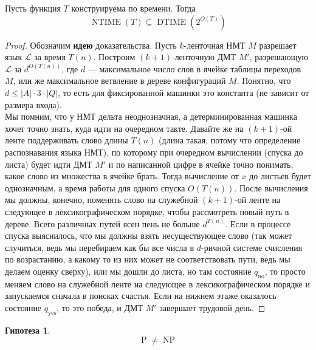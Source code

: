 \documentclass[11pt]{article}
\DeclareMathOperator{\DTIME}{DTIME}
\DeclareMathOperator{\NTIME}{NTIME}
\DeclareMathOperator{\Poly}{P}
\DeclareMathOperator{\NP}{NP}
\newtheorem{hypothesis}{Гипотеза}
\begin{document}
\begin{theorem}
    Пусть функция $T$ конструируема по времени. Тогда 
    \[\NTIME(T) \subseteq \DTIME(2^{O(T)})\]
\end{theorem}

\begin{proof}
    Обозначим \textbf{идею} доказательства. Пусть $k$-ленточная НМТ $M$ разрешает язык $\mathcal{L}$ за время $T(n)$. Построим $(k + 1)$-ленточную ДМТ $M'$, разрешающую $\mathcal{L}$ за $d^{O(T(n))}$, где $d$ --- максимальное число слов в ячейке таблицы переходов $M$, или же максимальное ветвление в дереве конфигураций $M$. Понятно, что $d \leq \left\lvert A \right\rvert \cdot 3 \cdot \left\lvert Q \right\rvert$, то есть для фиксированной машинки это константа (не зависит от размера входа). \\
    Мы помним, что у НМТ дельта неоднозначная, а детерминированная машинка хочет точно знать, куда идти на очередном такте. Давайте же на $(k + 1)$-ой ленте поддерживать слово длины $T(n)$ (длина такая, потому что определение распознавания языка НМТ), по которому при очередном вычислении (спуска до листа) будет идти ДМТ $M'$ и по написанной цифре в ячейке точно понимать, какое слово из множества в ячейке брать. Тогда вычисление от $x$ до листьев будет однозначным, а время работы для одного спуска $O(T(n))$. После вычисления мы должны, конечно, поменять слово на служебной $(k + 1)$-ой ленте на следующее в лексикографическом порядке, чтобы рассмотреть новый путь в дереве. Всего различных путей ясен пень не больше $d^{T(n)}$. Если в процессе спуска выяснилось, что мы должны взять несуществующее слово (так может случиться, ведь мы перебираем как бы все числа в $d$-ричной системе счисления по возрастанию, а какому то из них может не соответствовать пути, ведь мы делаем оценку сверху), или мы дошли до листа, но там состояние $q_{\text{no}}$, то просто меняем слово на служебной ленте на следующее в лексикографическом порядке и запускаемся сначала в поисках счастья. Если на нижнем этаже оказалось состояние $q_{\text{yes}}$, то это победа, и ДМТ $M'$ завершает трудовой день.
\end{proof}

\begin{hypothesis}
    \[\Poly \neq \NP\]
\end{hypothesis}
\end{document}
